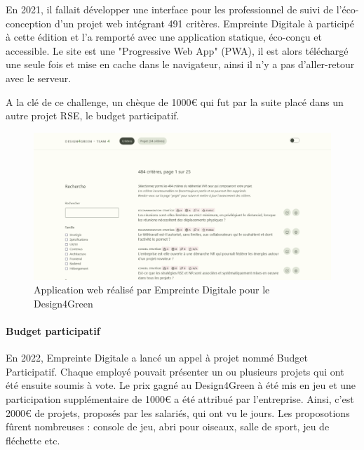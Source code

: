 \documentclass[12pt]{article}
\begin{document}
En 2021, il fallait développer une interface pour les professionnel de suivi de l'éco-conception d'un projet web intégrant 491 critères.
Empreinte Digitale à participé à cette édition et l'a remporté avec une application statique, éco-conçu et accessible.
Le site est une "Progressive Web App" (PWA), il est alors téléchargé une seule fois et mise en cache dans le navigateur, ainsi il n'y a pas d'aller-retour avec le serveur.

A la clé de ce challenge, un chèque de 1000€ qui fut par la suite placé dans un autre projet RSE, le budget participatif.

\begin{figure}[!ht]
    \centering
    \includegraphics[width=\textwidth]{src/design4fgreen.png}
    \caption{Application web réalisé par Empreinte Digitale pour le Design4Green}
    \label{fig:design4greenl}
\end{figure}

\paragraph{Budget participatif}
En 2022, Empreinte Digitale a lancé un appel à projet nommé Budget Participatif. 
Chaque employé pouvait présenter un ou plusieurs projets qui ont été ensuite soumis à vote. 
Le prix gagné au Design4Green à été mis en jeu et une participation supplémentaire de 1000€ a été attribué par l'entreprise. 
Ainsi, c'est 2000€ de projets, proposés par les salariés, qui ont vu le jours. 
Les proposotions fûrent nombreuses : console de jeu, abri pour oiseaux, salle de sport, jeu de fléchette etc.
\end{document}
